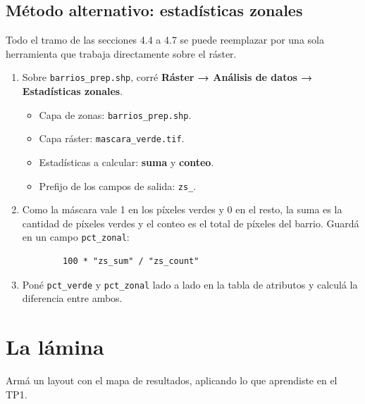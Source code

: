 \documentclass{article}
\begin{document}
\subsection{Método alternativo: estadísticas zonales}

Todo el tramo de las secciones 4.4 a 4.7 se puede reemplazar por una sola herramienta que trabaja directamente sobre el ráster.

\begin{enumerate}
    \item Sobre \texttt{barrios\_prep.shp}, corré \textbf{Ráster → Análisis de datos → Estadísticas zonales}.
    \begin{itemize}
        \item Capa de zonas: \texttt{barrios\_prep.shp}.
        \item Capa ráster: \texttt{mascara\_verde.tif}.
        \item Estadísticas a calcular: \textbf{suma} y \textbf{conteo}.
        \item Prefijo de los campos de salida: \texttt{zs\_}.
    \end{itemize}
    \item Como la máscara vale 1 en los píxeles verdes y 0 en el resto, la suma es la cantidad de píxeles verdes y el conteo es el total de píxeles del barrio. Guardá en un campo \texttt{pct\_zonal}:
    \begin{verbatim}
        100 * "zs_sum" / "zs_count"
    \end{verbatim}
    \item Poné \texttt{pct\_verde} y \texttt{pct\_zonal} lado a lado en la tabla de atributos y calculá la diferencia entre ambos.
\end{enumerate}

\section{La lámina}

Armá un layout con el mapa de resultados, aplicando lo que aprendiste en el TP1.
\end{document}
